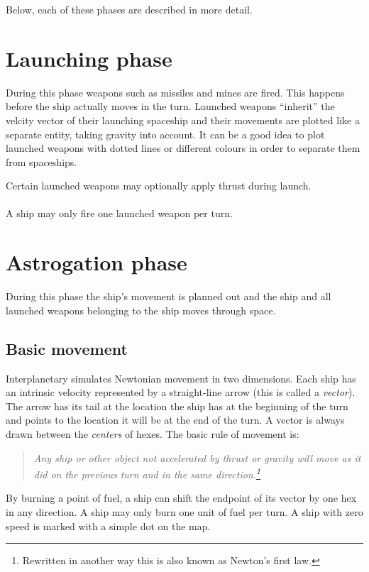 \documentclass[a4paper,12pt,notitlepage,twocolumn]{article}
\begin{document}
Below, each of these phases are described in more detail.

\section{Launching phase}

During this phase weapons such as missiles and mines are fired. This
happens before the ship actually moves in the turn.  Launched weapons 
``inherit'' the velcity vector of their launching spaceship and their
movements are plotted like a separate entity, taking gravity into
account. It can be a good idea to plot launched weapons with dotted
lines or different colours in order to separate them from spaceships.

Certain launched weapons may optionally apply thrust during launch. 
\\\\
A ship may only fire one launched weapon per turn.

\section{Astrogation phase}

During this phase the ship's movement is planned out and the ship
and all launched weapons belonging to the ship moves through space.

\subsection{Basic movement}

\label{sec:astrogation}
Interplanetary simulates Newtonian movement in two dimensions. Each ship
has an intrinsic velocity represented by a straight-line arrow (this
is called a \emph{vector}). The arrow has its tail at the location the
ship has at the beginning of the turn and points to the location it will
be at the end of the turn. A vector is always drawn between the
\emph{centers} of hexes. The basic rule of movement is: 
\begin{quotation}\noindent \emph{Any ship or other object not
        accelerated by thrust or gravity will move as it did on the
        previous turn and in the same direction.\footnote{Rewritten in another
          way this is also known as Newton's first law.}}
\end{quotation}

By burning a point of fuel, a ship can shift the endpoint of its
vector by one hex in any direction. A ship may only burn one unit of
fuel per turn. A ship with zero speed is marked with a simple dot on the map.
\end{document}
